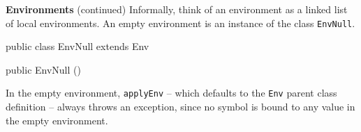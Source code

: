 \begin{minipage}[t]{\sw}
\slidenumber
\LARGE
{\bf Environments} (continued)\exx
Informally, think of an environment as a linked list of local environments.\exx
An empty environment is an instance of the class \verb'EnvNull'.
\begin{qv}
public class EnvNull extends Env {

    public EnvNull () {
    }

}
\end{qv}
In the empty environment, \verb'applyEnv' --
which defaults to the \verb'Env' parent class definition --
always throws an exception,
since no symbol is bound to any value in the empty environment.\exx
\end{minipage}

